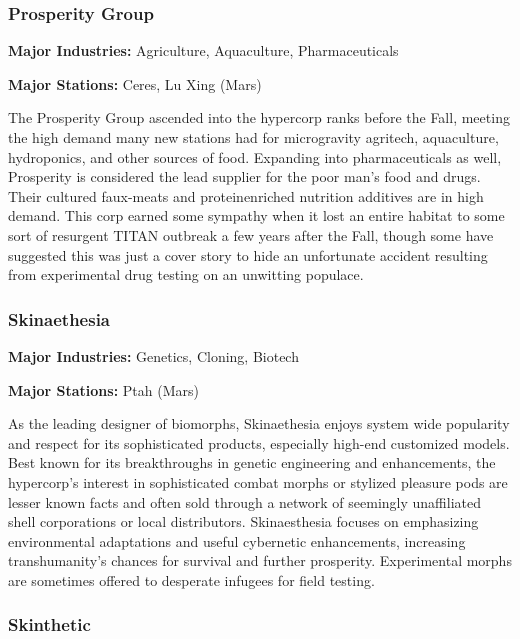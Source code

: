 \subsubsection{Prosperity Group}
\label{sec:prosperity-group} 

\textbf{Major Industries:} Agriculture, Aquaculture, Pharmaceuticals 

\textbf{Major Stations:} Ceres, Lu Xing (Mars) 

 The Prosperity Group ascended into the hypercorp ranks before the Fall, meeting the high demand many new stations had for microgravity agritech, aquaculture, hydroponics, and other sources of food. Expanding into pharmaceuticals as well, Prosperity is considered the lead supplier for the poor man's food and drugs. Their cultured faux-meats and proteinenriched nutrition additives are in high demand. This corp earned some sympathy when it lost an entire habitat to some sort of resurgent TITAN outbreak a few years after the Fall, though some have suggested this was just a cover story to hide an unfortunate accident resulting from experimental drug testing on an unwitting populace. 

\subsubsection{Skinaethesia}
\label{sec:skinaethesia} 

\textbf{Major Industries:} Genetics, Cloning, Biotech 

\textbf{Major Stations:} Ptah (Mars) 

 As the leading designer of biomorphs, Skinaethesia enjoys system wide popularity and respect for its sophisticated products, especially high-end customized models. Best known for its breakthroughs in genetic engineering and enhancements, the hypercorp's interest in sophisticated combat morphs or stylized pleasure pods are lesser known facts and often sold through a network of seemingly unaffiliated shell corporations or local distributors. Skinaesthesia focuses on emphasizing environmental adaptations and useful cybernetic enhancements, increasing transhumanity's chances for survival and further prosperity. Experimental morphs are sometimes offered to desperate infugees for field testing. 

\subsubsection{Skinthetic}
\label{sec:skinthetic} 

